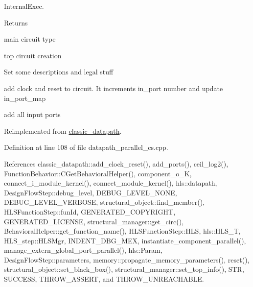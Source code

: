 Internal\+Exec. 

\begin{DoxyReturn}{Returns}

\end{DoxyReturn}
main circuit type

top circuit creation

Set some descriptions and legal stuff

add clock and reset to circuit. It increments in\+\_\+port number and update in\+\_\+port\+\_\+map

add all input ports 

Reimplemented from \hyperlink{classclassic__datapath_a2630a430a4a5513d7d6ce4b8a37b3dff}{classic\+\_\+datapath}.



Definition at line 108 of file datapath\+\_\+parallel\+\_\+cs.\+cpp.



References classic\+\_\+datapath\+::add\+\_\+clock\+\_\+reset(), add\+\_\+ports(), ceil\+\_\+log2(), Function\+Behavior\+::\+C\+Get\+Behavioral\+Helper(), component\+\_\+o\+\_\+K, connect\+\_\+i\+\_\+module\+\_\+kernel(), connect\+\_\+module\+\_\+kernel(), hls\+::datapath, Design\+Flow\+Step\+::debug\+\_\+level, D\+E\+B\+U\+G\+\_\+\+L\+E\+V\+E\+L\+\_\+\+N\+O\+NE, D\+E\+B\+U\+G\+\_\+\+L\+E\+V\+E\+L\+\_\+\+V\+E\+R\+B\+O\+SE, structural\+\_\+object\+::find\+\_\+member(), H\+L\+S\+Function\+Step\+::fun\+Id, G\+E\+N\+E\+R\+A\+T\+E\+D\+\_\+\+C\+O\+P\+Y\+R\+I\+G\+HT, G\+E\+N\+E\+R\+A\+T\+E\+D\+\_\+\+L\+I\+C\+E\+N\+SE, structural\+\_\+manager\+::get\+\_\+circ(), Behavioral\+Helper\+::get\+\_\+function\+\_\+name(), H\+L\+S\+Function\+Step\+::\+H\+LS, hls\+::\+H\+L\+S\+\_\+T, H\+L\+S\+\_\+step\+::\+H\+L\+S\+Mgr, I\+N\+D\+E\+N\+T\+\_\+\+D\+B\+G\+\_\+\+M\+EX, instantiate\+\_\+component\+\_\+parallel(), manage\+\_\+extern\+\_\+global\+\_\+port\+\_\+parallel(), hls\+::\+Param, Design\+Flow\+Step\+::parameters, memory\+::propagate\+\_\+memory\+\_\+parameters(), reset(), structural\+\_\+object\+::set\+\_\+black\+\_\+box(), structural\+\_\+manager\+::set\+\_\+top\+\_\+info(), S\+TR, S\+U\+C\+C\+E\+SS, T\+H\+R\+O\+W\+\_\+\+A\+S\+S\+E\+RT, and T\+H\+R\+O\+W\+\_\+\+U\+N\+R\+E\+A\+C\+H\+A\+B\+LE.

